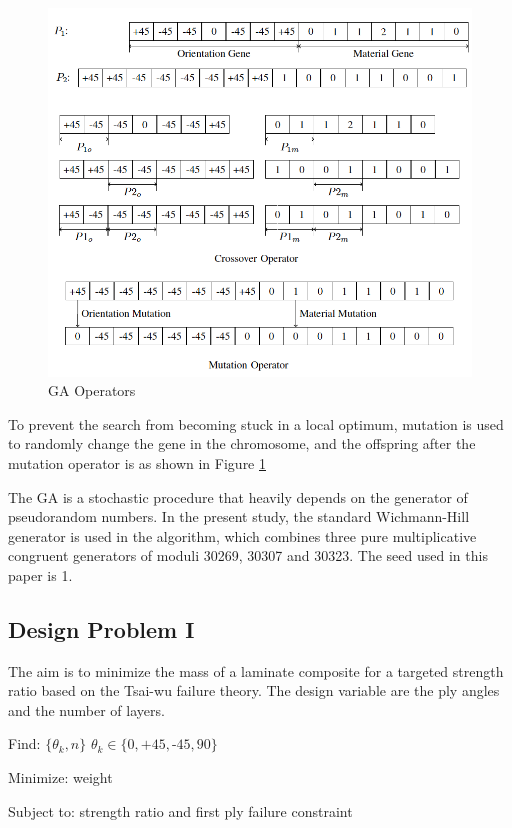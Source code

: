 \documentclass[USenglish]{article}
\begin{document}
\begin{figure}
  \includegraphics[width=\linewidth]{A_laminate_design_images/ga_operator.png}
\caption{GA Operators\label{GA:operator}}
\end{figure}

To prevent the search from becoming stuck in a local optimum, mutation is used to randomly change the
gene in the chromosome, and the offspring after the mutation operator is as shown in Figure
\ref{GA:operator}

The GA is a stochastic procedure that heavily depends on the generator of pseudorandom numbers. In
the present study, the standard Wichmann-Hill generator is used in the algorithm, which combines
three pure multiplicative congruent generators of moduli 30269, 30307 and 30323. The seed used
in this paper is 1.

\subsection{Design Problem I}

The aim is to minimize the mass of a laminate composite for a targeted strength
ratio based on the Tsai-wu failure theory. The design variable are the ply angles and the
number of layers.

Find: $\{\theta_k, n\}$ $\theta_k \in \{ 0,\text{+}45,\text{-}45,90\}$

Minimize: weight

Subject to: strength ratio and first ply failure constraint
\end{document}
